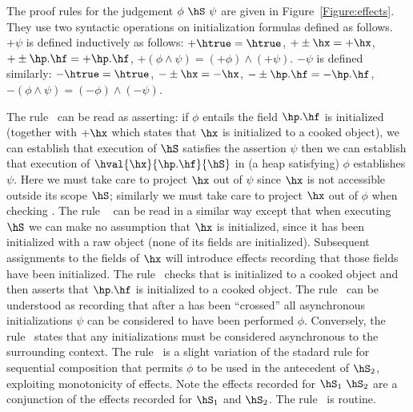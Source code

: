 The proof rules for the judgement $\phi~\hS~\psi$ are given in
Figure~\ref{Figure:effects}. They use two syntactic operations on initialization
formulas defined as follows.
$+\psi$ is defined inductively as follows:
$+\htrue=\htrue$,
$+\pm\hx=+\hx$,
$+\pm\hp.\hf=+\hp.\hf$,
$+(\phi \wedge\psi)=(+\phi)\wedge(+\psi)$.
$-\psi$ is defined similarly:
$-\htrue=\htrue$,
$-\pm\hx=-\hx$,
$-\pm\hp.\hf=-\hp.\hf$,
$-(\phi \wedge\psi)=(-\phi)\wedge(-\psi)$.

The rule~ can be read as asserting: if $\phi$ entails
the field $\hp.\hf$ is initialized
(together with $+\hx$ which states that $\hx$ is initialized to a
cooked object), we can establish that execution of $\hS$ satisfies the assertion
$\psi$ then we can establish that execution of
$\hval{\hx}{\hp.\hf}{\hS}$ in
(a heap satisfying) $\phi$ establishes $\psi$. Here we
must take care to project $\hx$ out of $\psi$ since $\hx$ is not
accessible outside its scope $\hS$; similarly we must take care to
project $\hx$ out of $\phi$ when checking \hS.
The rule ~ can be read in a similar way except that when
executing $\hS$ we can make no assumption that $\hx$ is initialized,
since it has been initialized with a raw object (none of its fields
are initialized). Subsequent assignments to the fields of $\hx$ will
introduce effects recording that those fields have been initialized.
The rule~ checks that \hq{} is initialized to a
cooked object and then asserts that $\hp.\hf$ is initialized to a
cooked object.
The rule~ can be understood as recording that after a
\hfinish{} has been ``crossed'' all asynchronous initializations $\psi$
can be considered to have been performed $\phi$. Conversely,
the rule~ states that any initializations must be
considered asynchronous to the surrounding context.
The rule~ is a slight variation of the stadard rule for
sequential composition that permits $\phi$ to be used in the
antecedent of $\hS_2$, exploiting monotonicity of effects. Note the
effects recorded for $\hS_1~\hS_2$ are a conjunction of the effects
recorded for $\hS_1$ and $\hS_2$.
The rule~ is routine.

